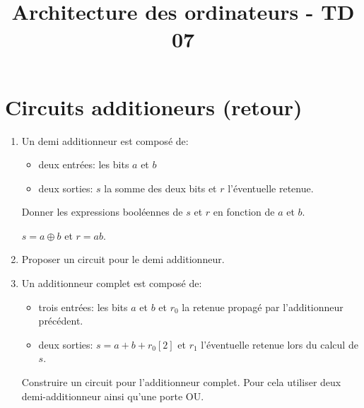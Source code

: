 \documentclass[a4paper,10pt]{exam}
\title{Architecture des ordinateurs - TD 07}
\author{}
\date{}
\begin{document}
\maketitle

\section{Circuits additioneurs (retour)}
\begin{enumerate}
\item Un demi additionneur est composé de:
  \begin{itemize}
  \item deux entrées: les bits $a$ et $b$
  \item deux sorties: $s$ la somme des deux bits et $r$ l'éventuelle retenue.
  \end{itemize}
  Donner les expressions booléennes de $s$ et $r$ en fonction de $a$ et $b$.
\begin{solution}
  $s = a \oplus b$ et $r = ab$.
\end{solution}
\item Proposer un circuit pour le demi additionneur.
\begin{solution}
\end{solution}
\item Un additionneur complet est composé de:
  \begin{itemize}
    \item trois entrées: les bits $a$ et $b$ et $r_0$ la retenue
      propagé par l'additionneur précédent.
    \item deux sorties: $s = a + b + r_0 [2]$ et $r_1$ l'éventuelle retenue lors
      du calcul de $s$.
  \end{itemize}
  Construire un circuit pour l'additionneur complet. Pour cela utiliser
  deux demi-additionneur ainsi qu'une porte OU.


\end{enumerate}
\end{document}
